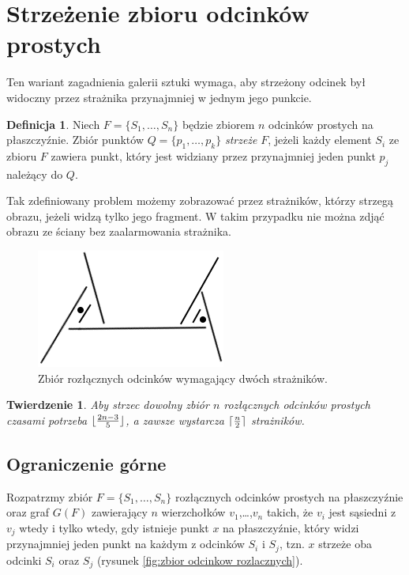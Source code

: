 \documentclass[brudnopis]{xmgr}
\DeclarePairedDelimiter\ceil{\lceil}{\rceil}
\DeclarePairedDelimiter\floor{\lfloor}{\rfloor}
\newtheorem{Twierdzenie}{Twierdzenie}
\theoremstyle{definition}
\newtheorem{Definicja}{Definicja}
\begin{document}
\section{Strzeżenie zbioru odcinków prostych}\label{sec:strzezenie odcinkow}
Ten wariant zagadnienia galerii sztuki wymaga, aby strzeżony odcinek był widoczny przez strażnika przynajmniej w jednym jego punkcie. 
\begin{Definicja}
Niech $F = \{S_1,\ldots,S_n\}$ będzie zbiorem $n$ odcinków prostych na płaszczyźnie. Zbiór punktów $Q = \{p_1,\ldots,p_k\}$ \emph{strzeże} $F$, jeżeli każdy element $S_i$ ze zbioru $F$ zawiera punkt, który jest widziany przez przynajmniej jeden punkt $p_j$ należący do $Q$.
\end{Definicja}
Tak zdefiniowany problem możemy zobrazować przez strażników, którzy strzegą obrazu, jeżeli widzą tylko jego fragment. W takim przypadku nie można zdjąć obrazu ze ściany bez zaalarmowania strażnika.
\begin{figure}[ht!]
 \centering
  \includegraphics{rysunki/rozlaczny_dwoch_straznikow.png}
  \caption{Zbiór rozłącznych odcinków wymagający dwóch strażników.}
\end{figure} 

\begin{Twierdzenie} \label{straznicy strzezenie} \cite{illumination}
Aby strzec dowolny zbiór $n$ rozłącznych odcinków prostych czasami potrzeba $\floor{\frac{2n-3}{5}}$, a zawsze wystarcza $\ceil{\frac{n}{2}}$ strażników.
\end{Twierdzenie}

\subsection{Ograniczenie górne}
Rozpatrzmy zbiór $F =\{S_1,\ldots,S_n\}$ rozłącznych odcinków prostych na płaszczyźnie oraz graf $G(F)$ zawierający $n$ wierzchołków $v_1$,\ldots,$v_n$ takich, że $v_i$ jest sąsiedni z $v_j$ wtedy i tylko wtedy, gdy istnieje punkt $x$ na płaszczyźnie, który widzi przynajmniej jeden punkt na każdym z odcinków $S_i$ i $S_j$, tzn. $x$ strzeże oba odcinki $S_i$ oraz $S_j$ (rysunek \ref{fig:zbior odcinkow rozlacznych}).
\end{document}

